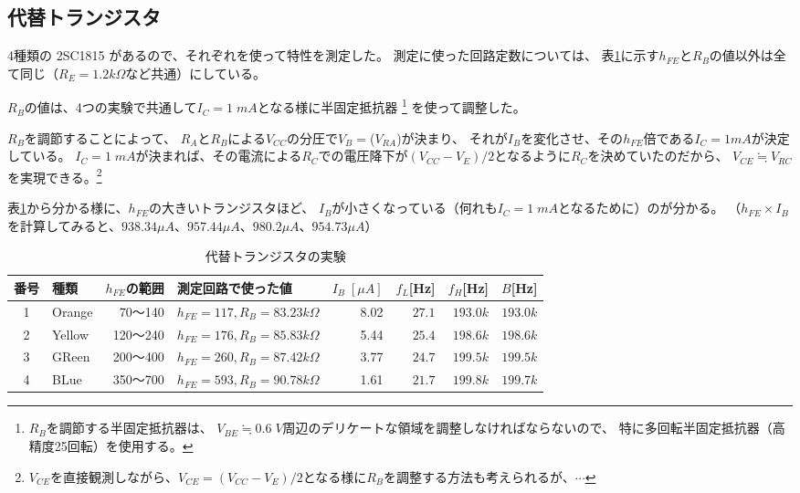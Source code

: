 \documentclass[uplatex,a4paper,11pt,oneside,openany]{jsbook}
\begin{document}
\newpage

\subsection{代替トランジスタ}

4種類の 2SC1815 があるので、それぞれを使って特性を測定した。
測定に使った回路定数については、
表\ref{table:type}に示す$h_{FE}$と$R_B$の値以外は全て同じ（$R_E=1.2k\Omega$など共通）にしている。

$R_B$の値は、4つの実験で共通して$I_C=1\;mA$となる様に半固定抵抗器
\footnote{$R_B$を調節する半固定抵抗器は、
$V_{BE}\fallingdotseq 0.6\;V$周辺のデリケートな領域を調整しなければならないので、
特に多回転半固定抵抗器（高精度25回転）を使用する。}
を使って調整した。

$R_B$を調節することによって、
$R_A$と$R_B$による$V_{CC}$の分圧で$V_B=$($V_{RA}$)が決まり、
それが$I_B$を変化させ、その$h_{FE}$倍である$I_C=1mA$が決定している。
$I_C=1\;mA$が決まれば、その電流による$R_C$での電圧降下が$(V_{CC}-V_E)/2$となるように$R_C$を決めていたのだから、
$V_{CE}\fallingdotseq V_{RC}$を実現できる。\footnote{$V_{CE}$を直接観測しながら、$V_{CE}=(V_{CC}-V_E)/2$となる様に$R_B$を調整する方法も考えられるが、$\cdots$}

表\ref{table:type}から分かる様に、$h_{FE}$の大きいトランジスタほど、
$I_B$が小さくなっている（何れも$I_C=1\;mA$となるために）のが分かる。
（$h_{FE}\times I_B$を計算してみると、$938.34\mu A$、$957.44\mu A$、$980.2\mu A$、$954.73\mu A$）

\begin{table}[hbtp]
  \caption{代替トランジスタの実験}
  \label{table:type}
  \centering
  \begin{tabular}{c||l|r||l|r|rrr} \hline
    番号 & 種類 & $h_{FE}$の範囲 & 測定回路で使った値 & $I_B\;[\mu A]$ &$f_L$[Hz] & $f_H$[Hz] & $B$[Hz] \\ \hline \hline
    1 & Orange & 70〜140 & $h_{FE}=117, R_B=83.23k\Omega$ & 8.02 & $27.1$&$193.0k$&$193.0k$ \\
    2 & Yellow & 120〜240 & $h_{FE}=176, R_B=85.83k\Omega$ & 5.44 & $25.4$&$198.6k$&$198.6k$ \\
    3 & GReen & 200〜400 & $h_{FE}=260, R_B=87.42k\Omega$ & 3.77 & $24.7$&$199.5k$&$199.5k$ \\
    4 & BLue & 350〜700 & $h_{FE}=593, R_B=90.78k\Omega$ & 1.61 & $21.7$&$199.8k$&$199.7k$ \\ \hline
  \end{tabular}
\end{table}
\end{document}
